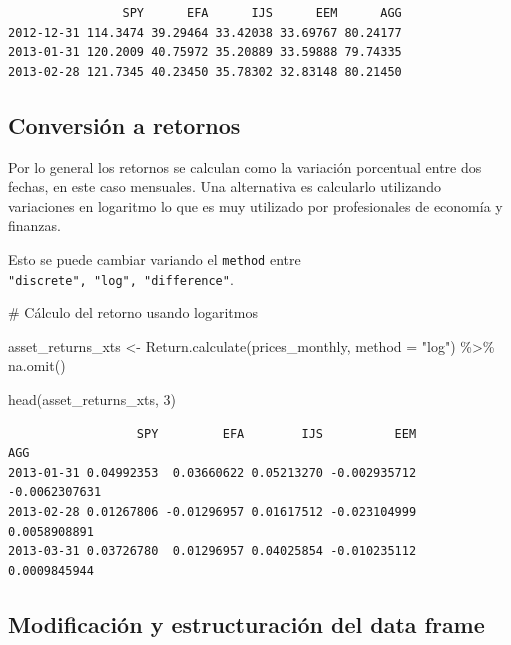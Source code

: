 \documentclass[
  letterpaper,
  DIV=11,
  numbers=noendperiod]{scrartcl}
\newenvironment{Shaded}{\begin{snugshade}}{\end{snugshade}}
\newcommand{\AttributeTok}[1]{\textcolor[rgb]{0.40,0.45,0.13}{#1}}
\newcommand{\CommentTok}[1]{\textcolor[rgb]{0.37,0.37,0.37}{#1}}
\newcommand{\DecValTok}[1]{\textcolor[rgb]{0.68,0.00,0.00}{#1}}
\newcommand{\FunctionTok}[1]{\textcolor[rgb]{0.28,0.35,0.67}{#1}}
\newcommand{\NormalTok}[1]{\textcolor[rgb]{0.00,0.23,0.31}{#1}}
\newcommand{\OtherTok}[1]{\textcolor[rgb]{0.00,0.23,0.31}{#1}}
\newcommand{\SpecialCharTok}[1]{\textcolor[rgb]{0.37,0.37,0.37}{#1}}
\newcommand{\StringTok}[1]{\textcolor[rgb]{0.13,0.47,0.30}{#1}}
\begin{document}
\begin{verbatim}
                SPY      EFA      IJS      EEM      AGG
2012-12-31 114.3474 39.29464 33.42038 33.69767 80.24177
2013-01-31 120.2009 40.75972 35.20889 33.59888 79.74335
2013-02-28 121.7345 40.23450 35.78302 32.83148 80.21450
\end{verbatim}

\subsection{Conversión a retornos}\label{conversiuxf3n-a-retornos}

Por lo general los retornos se calculan como la variación porcentual
entre dos fechas, en este caso mensuales. Una alternativa es calcularlo
utilizando variaciones en logaritmo lo que es muy utilizado por
profesionales de economía y finanzas.

Esto se puede cambiar variando el \texttt{method} entre
\texttt{"discrete",\ "log",\ "difference"}.

\begin{Shaded}
\begin{Highlighting}[]
\CommentTok{\# Cálculo del retorno usando logaritmos}

\NormalTok{asset\_returns\_xts }\OtherTok{\textless{}{-}}
  \FunctionTok{Return.calculate}\NormalTok{(prices\_monthly,}
                   \AttributeTok{method =} \StringTok{"log"}\NormalTok{) }\SpecialCharTok{\%\textgreater{}\%}
  \FunctionTok{na.omit}\NormalTok{()}

\FunctionTok{head}\NormalTok{(asset\_returns\_xts, }\DecValTok{3}\NormalTok{)}
\end{Highlighting}
\end{Shaded}

\begin{verbatim}
                  SPY         EFA        IJS          EEM           AGG
2013-01-31 0.04992353  0.03660622 0.05213270 -0.002935712 -0.0062307631
2013-02-28 0.01267806 -0.01296957 0.01617512 -0.023104999  0.0058908891
2013-03-31 0.03726780  0.01296957 0.04025854 -0.010235112  0.0009845944
\end{verbatim}

\subsection{Modificación y estructuración del data
frame}\label{modificaciuxf3n-y-estructuraciuxf3n-del-data-frame}
\end{document}
